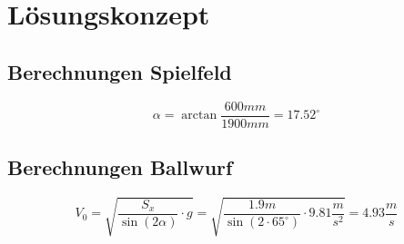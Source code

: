 \section{Lösungskonzept}

\subsection{Berechnungen Spielfeld}

\[\alpha = \arctan \frac{600mm}{1900mm} = 17.52^\circ \]


\subsection{Berechnungen Ballwurf}

\[ V_0 = \sqrt{ \frac{S_x}{\sin(2\alpha)} \cdot g } = \sqrt{ \frac{1.9m}{\sin(2 \cdot 65^\circ)} \cdot 9.81 \frac{m}{s^2}} = 4.93 \frac{m}{s} \]
